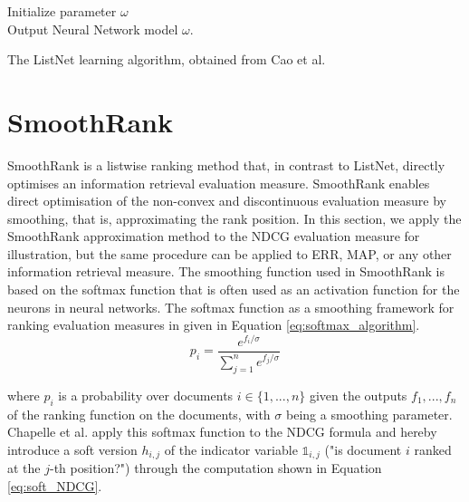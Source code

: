 \LinesNumbered
\begin{algorithm}[H]
 Initialize parameter $\omega$\\
 Output Neural Network model $\omega$.
 \caption{The ListNet learning algorithm, obtained from Cao et al. \cite{Cao2007}}
 \label{alg:listnet}
\end{algorithm}

\section{SmoothRank}
SmoothRank \cite{Chapelle2010} is a listwise ranking method that, in contrast to ListNet, directly optimises an information retrieval evaluation measure. SmoothRank enables direct optimisation of the non-convex and discontinuous evaluation measure by smoothing, that is, approximating the rank position. In this section, we apply the SmoothRank approximation method to the \ac{NDCG} evaluation measure for illustration, but the same procedure can be applied to \ac{ERR}, \ac{MAP}, or any other information retrieval measure. The smoothing function used in SmoothRank is based on the softmax function \cite{Bridle1990} that is often used as an activation function for the neurons in neural networks. The softmax function as a smoothing framework for ranking evaluation measures in given in Equation \ref{eq:softmax_algorithm}.
\begin{equation}
p_i = \frac{e^{f_i/\sigma}}{\sum\nolimits_{j=1}^{n}e^{f_j/\sigma}}
\label{eq:softmax_algorithm}
\end{equation}

where $p_i$ is a probability over documents $i \in \{1,...,n\}$ given the outputs $f_1,...,f_n$ of the ranking function on the documents, with $\sigma$ being a smoothing parameter. Chapelle et al. \cite{Chapelle2010} apply this softmax function to the \ac{NDCG} formula and hereby introduce a soft version $h_{i,j}$ of the indicator variable $\mathbb{1}_{i,j}$ ("is document $i$ ranked at the $j$-th position?") through the computation shown in Equation \ref{eq:soft_NDCG}.

